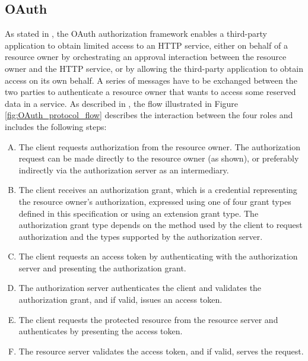 \subsection{OAuth}
As stated in \cite{ietf_oauth2}, the \gls{OAuth} authorization framework enables a third-party application to obtain limited access to an HTTP service, either on behalf of a resource owner by orchestrating an approval interaction between the resource owner and the HTTP service, or by allowing the third-party application to obtain access on its own behalf.
A series of messages have to be exchanged between the two parties to authenticate a resource owner that wants to access some reserved data in a service. As described in \cite{ietf_oauth2}, the flow illustrated in Figure \ref{fig:OAuth_protocol_flow} describes the interaction between the four roles and includes the following steps:
\begin{enumerate}[(A)]
    \item The client requests authorization from the resource owner.  The authorization request can be made directly to the resource owner (as shown), or preferably indirectly via the authorization server as an intermediary.
    \item The client receives an authorization grant, which is a credential representing the resource owner's authorization, expressed using one of four grant types defined in this specification or using an extension grant type. The authorization grant type depends on the method used by the client to request authorization and the types supported by the authorization server.
    \item The client requests an access token by authenticating with the authorization server and presenting the authorization grant.
    \item The authorization server authenticates the client and validates the authorization grant, and if valid, issues an access token.
    \item The client requests the protected resource from the resource server and authenticates by presenting the access token.
    \item The resource server validates the access token, and if valid, serves the request.
\end{enumerate}
 
